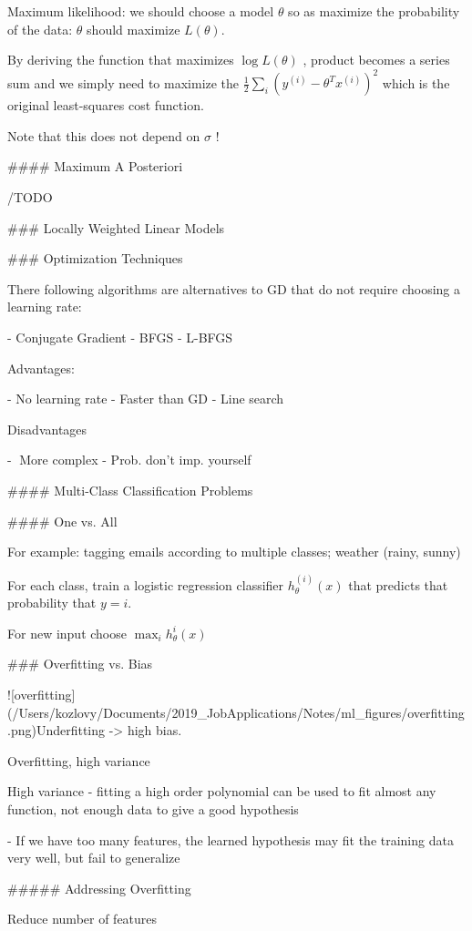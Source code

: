 Maximum likelihood: we should choose a model $\theta$ so as maximize the probability of the data: $\theta$ should maximize $L(\theta)$. 

By deriving the function that maximizes $\log L(\theta)$ , product becomes a series sum and we simply need to maximize the $\frac 1 2 \sum_i (y^{(i)}-\theta^T x^{(i)})^2$ which is the original least-squares cost function.

Note that this does not depend on $\sigma$ !

#### Maximum A Posteriori

/TODO

### Locally  Weighted Linear Models





### Optimization Techniques 

There following algorithms are alternatives to GD that do not require choosing a learning rate:

- Conjugate Gradient
- BFGS
- L-BFGS

Advantages:

- No learning rate
- Faster than GD
- Line search

Disadvantages

- More complex
- Prob. don't imp. yourself

#### Multi-Class Classification Problems

#### One vs. All

For example: tagging emails according to multiple classes; weather (rainy, sunny)

For each class, train a logistic regression classifier $h_{\theta}^{(i)}(x)$ that predicts that probability that $y=i$.

For new input choose $\max_ih_\theta^i(x)$

### Overfitting vs. Bias

 ![overfitting](/Users/kozlovy/Documents/2019_JobApplications/Notes/ml_figures/overfitting.png)Underfitting -> high bias. 

Overfitting, high variance

High variance - fitting a high order polynomial can be used to fit almost any function, not enough data to give a good hypothesis

- If we have too many features, the learned hypothesis may fit the training data very well, but fail to generalize

##### Addressing Overfitting

Reduce number of features

